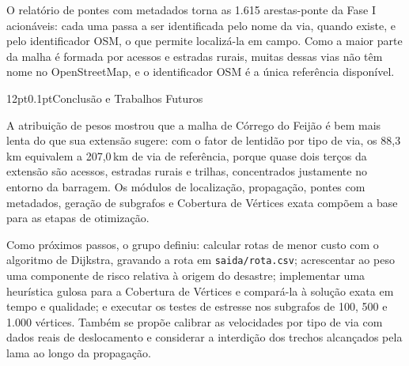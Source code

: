 \documentclass[12pt,a4paper]{article}
\makeatletter
\renewcommand\section{\@startsection{section}{1}{\z@}%
  {12pt}{0.1pt}{\normalfont\fontsize{13}{15}\selectfont\bfseries}}
\makeatother
\begin{document}
O relatório de pontes com metadados torna as 1.615 arestas-ponte da Fase I acionáveis: cada uma passa a ser identificada pelo nome da via, quando existe, e pelo identificador OSM, o que permite localizá-la em campo. Como a maior parte da malha é formada por acessos e estradas rurais, muitas dessas vias não têm nome no OpenStreetMap, e o identificador OSM é a única referência disponível.

\section{Conclusão e Trabalhos Futuros}

A atribuição de pesos mostrou que a malha de Córrego do Feijão é bem mais lenta do que sua extensão sugere: com o fator de lentidão por tipo de via, os 88,3\,km equivalem a 207,0\,km de via de referência, porque quase dois terços da extensão são acessos, estradas rurais e trilhas, concentrados justamente no entorno da barragem. Os módulos de localização, propagação, pontes com metadados, geração de subgrafos e Cobertura de Vértices exata compõem a base para as etapas de otimização.

Como próximos passos, o grupo definiu: calcular rotas de menor custo com o algoritmo de Dijkstra, gravando a rota em \texttt{saida/rota.csv}; acrescentar ao peso uma componente de risco relativa à origem do desastre; implementar uma heurística gulosa para a Cobertura de Vértices e compará-la à solução exata em tempo e qualidade; e executar os testes de estresse nos subgrafos de 100, 500 e 1.000 vértices. Também se propõe calibrar as velocidades por tipo de via com dados reais de deslocamento e considerar a interdição dos trechos alcançados pela lama ao longo da propagação.
\end{document}
